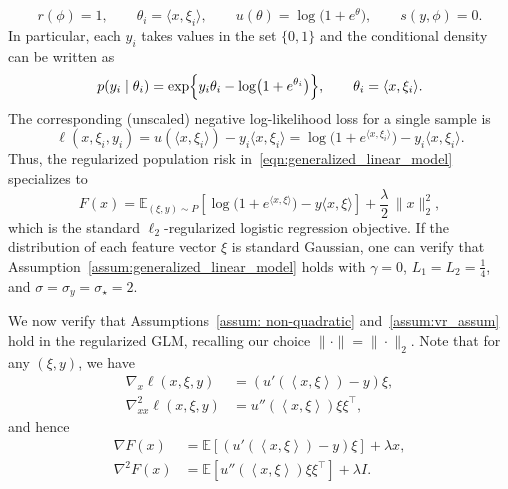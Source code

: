 \documentclass[11pt,twoside]{article}
\numberwithin{equation}{section}
\newcommand{\EE}{\mathbb{E}}
\newcommand{\1}{\mathbf{1}}
\newcommand{\dotp}[1]{\left\langle #1\right\rangle}
\theoremstyle{remark}
\theoremstyle{plain}
\begin{document}
\[
r(\phi) = 1,\qquad
\theta_i = \langle x,\xi_i\rangle,\qquad
u(\theta) = \log\bigl(1 + e^{\theta}\bigr),\qquad
s(y,\phi) = 0.
\]
In particular, each $y_i$ takes values in the set $\{0, 1\}$ and the conditional density can be written as
\[
p(y_i \mid \theta_i)
= \exp\Bigl\{ y_i \theta_i - \log\bigl(1 + e^{\theta_i}\bigr) \Bigr\},
\qquad \theta_i = \langle x,\xi_i\rangle.
\]
The corresponding (unscaled) negative log-likelihood loss for a single sample is
\[
\ell(x,\xi_i,y_i)
= u(\langle x,\xi_i\rangle) - y_i \langle x,\xi_i\rangle
= \log\bigl(1 + e^{\langle x,\xi_i\rangle}\bigr) - y_i \langle x,\xi_i\rangle.
\]
Thus, the regularized population risk in~\eqref{eqn:generalized_linear_model}
specializes to
\[
F(x)
= \EE_{(\xi,y)\sim P}\!\left[\log\bigl(1 + e^{\langle x,\xi\rangle}\bigr)
- y \langle x,\xi\rangle\right]
+ \frac{\lambda}{2}\,\|x\|_2^2,
\]
which is the standard $\ell_2$-regularized logistic regression objective. If the distribution of each feature vector $\xi$ is standard Gaussian, one can verify that Assumption~\ref{assum:generalized_linear_model} holds with $\gamma = 0$, $L_1 = L_2 = \frac{1}{4}$, and $\sigma = \sigma_y = \sigma_\star =2.$

We now verify that Assumptions~\ref{assum: non-quadratic} and~\ref{assum:vr_assum} hold in the regularized GLM, recalling our choice $\| \cdot \| = \| \cdot \|_2$.  Note that for any $(\xi,y)$, we have
\begin{align*}
\nabla_x \ell(x,\xi, y)
&= (u'(\dotp{x,\xi})-y)\xi, \\
\nabla_{xx}^2 \ell( x,\xi ,y)
&= u''(\dotp{x,\xi})\xi\xi^\top,
\end{align*}
and hence
\begin{align*}
\nabla F(x) &= \EE\!\left[(u'(\dotp{x,\xi})-y)\xi\right] + \lambda x,\\
\nabla^2 F(x) &= \EE\!\left[u''(\dotp{x,\xi})\xi\xi^\top\right] + \lambda I.
\end{align*}
\end{document}
